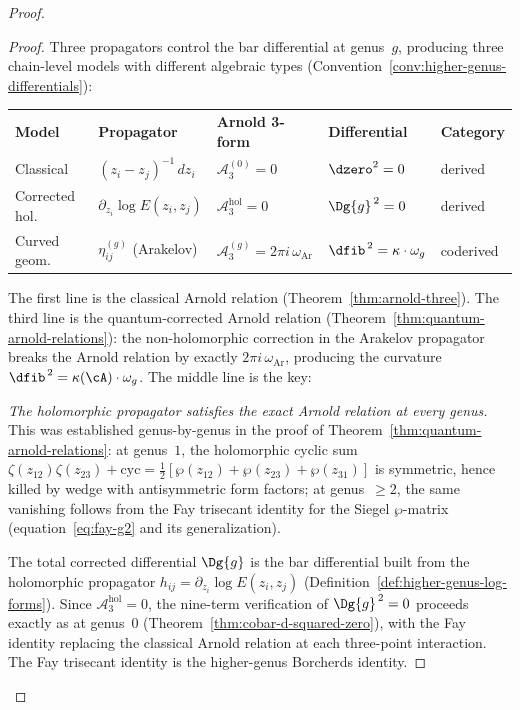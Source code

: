 \begin{proof}
\begin{proof}
Three propagators control the bar differential at genus~$g$,
producing three chain-level models with different algebraic types
(Convention~\ref{conv:higher-genus-differentials}):
\begin{center}
\small
\begin{tabular}{lllll}
\textbf{Model} & \textbf{Propagator} & \textbf{Arnold 3-form} & \textbf{Differential} & \textbf{Category} \\[2pt]
Classical &
 $(z_i - z_j)^{-1}\,dz_i$ &
 $\mathcal{A}_3^{(0)} = 0$ &
 $\dzero^2 = 0$ &
 derived \\[2pt]
Corrected hol.\ &
 $\partial_{z_i}\!\log E(z_i,z_j)$ &
 $\mathcal{A}_3^{\mathrm{hol}} = 0$ &
 $\Dg{g}^{\,2} = 0$ &
 derived \\[2pt]
Curved geom.\ &
 $\eta_{ij}^{(g)}$ (Arakelov) &
 $\mathcal{A}_3^{(g)} = 2\pi i\,\omega_{\mathrm{Ar}}$ &
 $\dfib^{\,2} = \kappa\cdot\omega_g$ &
 coderived
\end{tabular}
\end{center}
The first line is the classical Arnold relation
(Theorem~\ref{thm:arnold-three}).
The third line is the quantum-corrected Arnold relation
(Theorem~\ref{thm:quantum-arnold-relations}):
the non-holomorphic correction in the Arakelov propagator
breaks the Arnold relation by exactly
$2\pi i\,\omega_{\mathrm{Ar}}$, producing the curvature
$\dfib^{\,2} = \kappa(\cA)\cdot\omega_g$.
The middle line is the key:

\emph{The holomorphic propagator satisfies the exact Arnold
relation at every genus.} This was established
genus-by-genus in the proof of
Theorem~\ref{thm:quantum-arnold-relations}:
at genus~$1$, the holomorphic cyclic sum
$\zeta(z_{12})\zeta(z_{23}) + \mathrm{cyc}
= \frac{1}{2}[\wp(z_{12}) + \wp(z_{23}) + \wp(z_{31})]$
is symmetric, hence killed by wedge with antisymmetric
form factors; at genus~$\geq 2$, the same vanishing
follows from the Fay trisecant identity for the Siegel
$\wp$-matrix (equation~\eqref{eq:fay-g2} and its
generalization).

The total corrected differential $\Dg{g}$ is the bar
differential built from the holomorphic propagator
$h_{ij} = \partial_{z_i}\!\log E(z_i, z_j)$
(Definition~\ref{def:higher-genus-log-forms}).
Since $\mathcal{A}_3^{\mathrm{hol}} = 0$, the nine-term
verification of $\Dg{g}^{\,2} = 0$ proceeds exactly as at
genus~$0$ (Theorem~\ref{thm:cobar-d-squared-zero}),
with the Fay identity replacing the classical Arnold
relation at each three-point interaction.
The Fay trisecant identity is the higher-genus
Borcherds identity.


\end{proof}
\end{proof}

